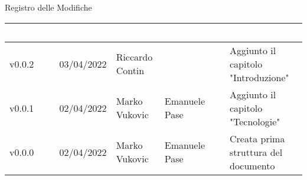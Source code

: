 \begin{center}
  \huge{Registro delle Modifiche}
\end{center}
\renewcommand\arraystretch{1,5}
{\centering
\begin{longtable}{|C{1.8cm}|C{2.1cm}|C{2cm}|C{2.4cm}|L{4.4cm}|}
  \hline
  \textcolor[HTML]{FFFFFF}{\textbf{Versione}} & \textcolor[HTML]{FFFFFF}{\textbf{Data}} & \textcolor[HTML]{FFFFFF}{\textbf{Autore}}  & \textcolor[HTML]{FFFFFF}{\textbf{Verificatore}} & \textcolor[HTML]{FFFFFF}{\textbf{Modifica}}    \\ \hline
  v0.0.2        & 03/04/2022    & Riccardo Contin   &         & Aggiunto il capitolo "Introduzione" \\ \hline
  v0.0.1        & 02/04/2022    & Marko Vukovic   & Emanuele Pase         & Aggiunto il capitolo "Tecnologie" \\ \hline
  v0.0.0        & 02/04/2022    & Marko Vukovic   & Emanuele Pase         & Creata prima struttura del documento \\ \hline
\end{longtable}}

\renewcommand\arraystretch{1}
